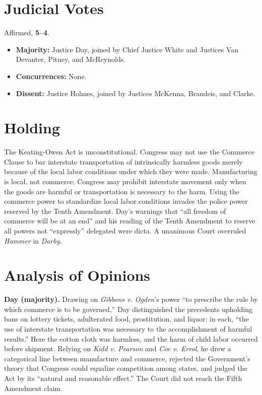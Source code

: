 \documentclass[12pt]{article}
\begin{document}
\section{Judicial Votes}

Affirmed, \textbf{5--4}.
\begin{itemize}
\item \textbf{Majority:} Justice Day, joined by Chief Justice White and Justices Van Devanter, Pitney, and McReynolds.
\item \textbf{Concurrences:} None.
\item \textbf{Dissent:} Justice Holmes, joined by Justices McKenna, Brandeis, and Clarke.
\end{itemize}

\section{Holding}

The Keating-Owen Act is unconstitutional. Congress may not use the Commerce Clause to bar interstate transportation of intrinsically harmless goods merely because of the local labor conditions under which they were made. Manufacturing is local, not commerce; Congress may prohibit interstate movement only when the goods are harmful or transportation is necessary to the harm. Using the commerce power to standardize local labor conditions invades the police power reserved by the Tenth Amendment. Day's warnings that ``all freedom of commerce will be at an end'' and his reading of the Tenth Amendment to reserve all powers not ``expressly'' delegated were dicta. A unanimous Court overruled \textit{Hammer} in \textit{Darby}.

\section{Analysis of Opinions}

\textbf{Day (majority).} Drawing on \textit{Gibbons v. Ogden}'s power ``to prescribe the rule by which commerce is to be governed,'' Day distinguished the precedents upholding bans on lottery tickets, adulterated food, prostitution, and liquor: in each, ``the use of interstate transportation was necessary to the accomplishment of harmful results.'' Here the cotton cloth was harmless, and the harm of child labor occurred before shipment. Relying on \textit{Kidd v. Pearson} and \textit{Coe v. Errol}, he drew a categorical line between manufacture and commerce, rejected the Government's theory that Congress could equalize competition among states, and judged the Act by its ``natural and reasonable effect.'' The Court did not reach the Fifth Amendment claim.
\end{document}
